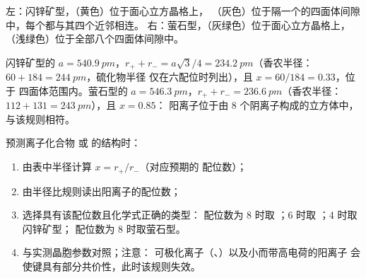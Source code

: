 \begin{omfigure}

{\small 左：闪锌矿型，（黄色）位于面心立方晶格上，
（灰色）位于隔一个的四面体间隙中，每个都与其四个近邻相连。
右：萤石型，（灰绿色）位于面心立方晶格上，
（浅绿色）位于全部八个四面体间隙中。}
\end{omfigure}

\begin{example}[闪锌矿型与萤石型]\label{ex:b1:crystals-ionic-covalent:zns}
闪锌矿型的 $a = \qty{540.9}{pm}$，$r_+ + r_- = a\sqrt3/4 =
\qty{234.2}{pm}$（香农半径：$60 + 184 = \qty{244}{pm}$，硫化物半径
仅在六配位时列出），且 $x = 60/184 = 0.33$，位于
四面体范围内。萤石型的 $a = \qty{546.3}{pm}$，$r_+ + r_- =
\qty{236.6}{pm}$（香农半径：$112 + 131 = \qty{243}{pm}$），且 $x = 0.85$：
阳离子位于由 8 个阴离子构成的立方体中，与该规则相符。
\end{example}

\begin{method}[预测结构]\label{met:b1:crystals-ionic-covalent:predict}
预测离子化合物  或  的结构时：
\begin{enumerate}
  \item 由表中半径计算 $x = r_+/r_-$（对应预期的
        配位数）；
  \item 由半径比规则读出阳离子的配位数；
  \item 选择具有该配位数且化学式正确的类型：
         配位数为 8 时取 ；6 时取 ；4 时取闪锌矿型；
         配位数为 8 时取萤石型。
  \item 与实测晶胞参数对照；注意：
        可极化离子（、）以及小而带高电荷的阳离子
        会使键具有部分共价性，此时该规则失效。
\end{enumerate}
\end{method}

